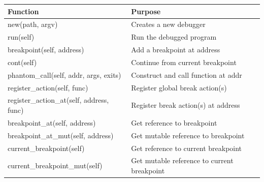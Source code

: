 \documentclass{article}
\begin{document}
\begin{center}
    \begin{tabular}{|l|l|}
    \hline
    \bf Function & \bf Purpose \\ \hline
    new(path, argv) & Creates a new debugger \\ \hline
    run(self) & Run the debugged program \\ \hline
    breakpoint(self, address) & Add a breakpoint at address \\ \hline
    cont(self) & Continue from current breakpoint \\ \hline
    phantom\_call(self, addr, args, exits) & Construct and call function at addr \\ \hline
    register\_action(self, func) & Register global break action(s) \\ \hline
    register\_action\_at(self, address, func) & Register break action(s) at address \\ \hline
    breakpoint\_at(self, address) & Get reference to breakpoint \\ \hline
    breakpoint\_at\_mut(self, address) & Get mutable reference to breakpoint \\ \hline
    current\_breakpoint(self) & Get reference to current breakpoint \\ \hline
    current\_breakpoint\_mut(self) & Get mutable reference to current breakpoint \\ \hline
    \end{tabular}
\end{center}
\end{document}
